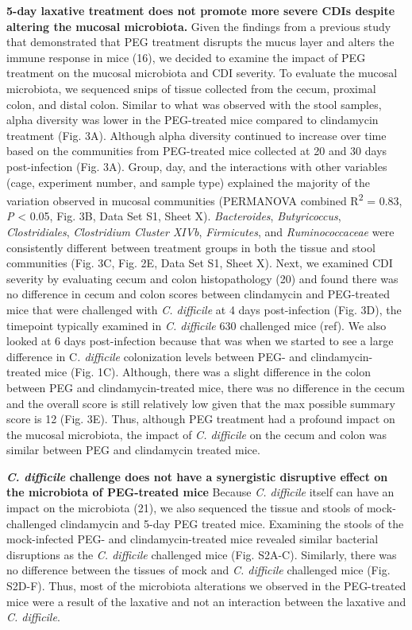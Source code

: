 \documentclass[
  11pt,
]{article}
\begin{document}
\textbf{5-day laxative treatment does not promote more severe CDIs
despite altering the mucosal microbiota.} Given the findings from a
previous study that demonstrated that PEG treatment disrupts the mucus
layer and alters the immune response in mice (16), we decided to examine
the impact of PEG treatment on the mucosal microbiota and CDI severity.
To evaluate the mucosal microbiota, we sequenced snips of tissue
collected from the cecum, proximal colon, and distal colon. Similar to
what was observed with the stool samples, alpha diversity was lower in
the PEG-treated mice compared to clindamycin treatment (Fig. 3A).
Although alpha diversity continued to increase over time based on the
communities from PEG-treated mice collected at 20 and 30 days
post-infection (Fig. 3A). Group, day, and the interactions with other
variables (cage, experiment number, and sample type) explained the
majority of the variation observed in mucosal communities (PERMANOVA
combined R\textsuperscript{2} = 0.83, \emph{P} \textless{} 0.05, Fig.
3B, Data Set S1, Sheet X). \emph{Bacteroides}, \emph{Butyricoccus},
\emph{Clostridiales}, \emph{Clostridium Cluster XIVb},
\emph{Firmicutes}, and \emph{Ruminococcaceae} were consistently
different between treatment groups in both the tissue and stool
communities (Fig. 3C, Fig. 2E, Data Set S1, Sheet X). Next, we examined
CDI severity by evaluating cecum and colon histopathology (20) and found
there was no difference in cecum and colon scores between clindamycin
and PEG-treated mice that were challenged with \emph{C. difficile} at 4
days post-infection (Fig. 3D), the timepoint typically examined in
\emph{C. difficile} 630 challenged mice (ref). We also looked at 6 days
post-infection because that was when we started to see a large
difference in C\emph{. difficile} colonization levels between PEG- and
clindamycin-treated mice (Fig. 1C). Although, there was a slight
difference in the colon between PEG and clindamycin-treated mice, there
was no difference in the cecum and the overall score is still relatively
low given that the max possible summary score is 12 (Fig. 3E). Thus,
although PEG treatment had a profound impact on the mucosal microbiota,
the impact of \emph{C. difficile} on the cecum and colon was similar
between PEG and clindamycin treated mice.

\textbf{\emph{C. difficile} challenge does not have a synergistic
disruptive effect on the microbiota of PEG-treated mice} Because
\emph{C. difficile} itself can have an impact on the microbiota (21), we
also sequenced the tissue and stools of mock-challenged clindamycin and
5-day PEG treated mice. Examining the stools of the mock-infected PEG-
and clindamycin-treated mice revealed similar bacterial disruptions as
the \emph{C. difficile} challenged mice (Fig. S2A-C). Similarly, there
was no difference between the tissues of mock and \emph{C. difficile}
challenged mice (Fig. S2D-F). Thus, most of the microbiota alterations
we observed in the PEG-treated mice were a result of the laxative and
not an interaction between the laxative and \emph{C. difficile}.
\end{document}
